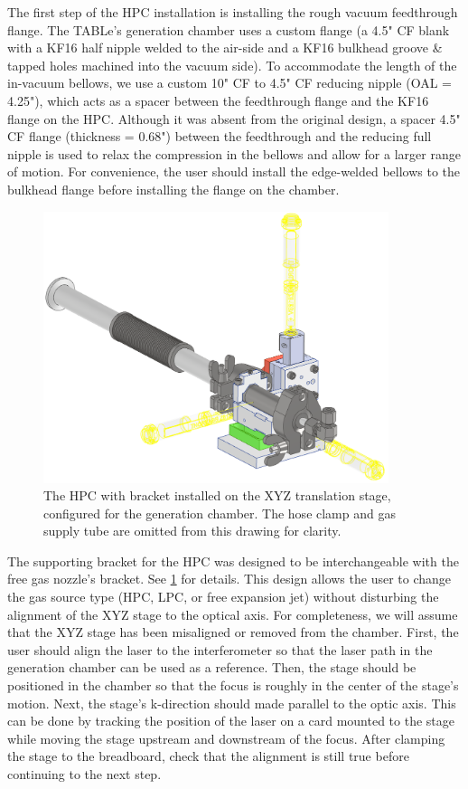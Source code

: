 The first step of the HPC installation is installing the rough vacuum feedthrough flange. The TABLe's generation chamber uses a custom flange (a 4.5" CF blank with a KF16 half nipple welded to the air-side and a KF16 bulkhead groove \& tapped holes machined into the vacuum side). To accommodate the length of the in-vacuum bellows, we use a custom 10" CF to 4.5" CF reducing nipple (OAL = 4.25"), which acts as a spacer between the feedthrough flange and the KF16 flange on the HPC. Although it was absent from the original design, a spacer 4.5" CF flange (thickness = 0.68") between the feedthrough and the reducing full nipple is used to relax the compression in the bellows and allow for a larger range of motion. For convenience, the user should install the edge-welded bellows to the bulkhead flange before installing the flange on the chamber.

\begin{figure}
	\centering
	\includegraphics[width=0.9\textwidth]{figures/app1/HPC_on_stage2.png}
	\caption{The HPC with bracket installed on the XYZ translation stage, configured for the generation chamber. The hose clamp and gas supply tube are omitted from this drawing for clarity.}
	\label{fig:HPC_on_stage}
\end{figure}

The supporting bracket for the HPC was designed to be interchangeable with the free gas nozzle's bracket. See \cref{fig:HPC_on_stage} for details. This design allows the user to change the gas source type (HPC, LPC, or free expansion jet) without disturbing the alignment of the XYZ stage to the optical axis. For completeness, we will assume that the XYZ stage has been misaligned or removed from the chamber. First, the user should align the laser to the interferometer so that the laser path in the generation chamber can be used as a reference. Then, the stage should be positioned in the chamber so that the focus is roughly in the center of the stage's motion. Next, the stage's k-direction should made parallel to the optic axis. This can be done by tracking the position of the laser on a card mounted to the stage while moving the stage upstream and downstream of the focus. After clamping the stage to the breadboard, check that the alignment is still true before continuing to the next step.

